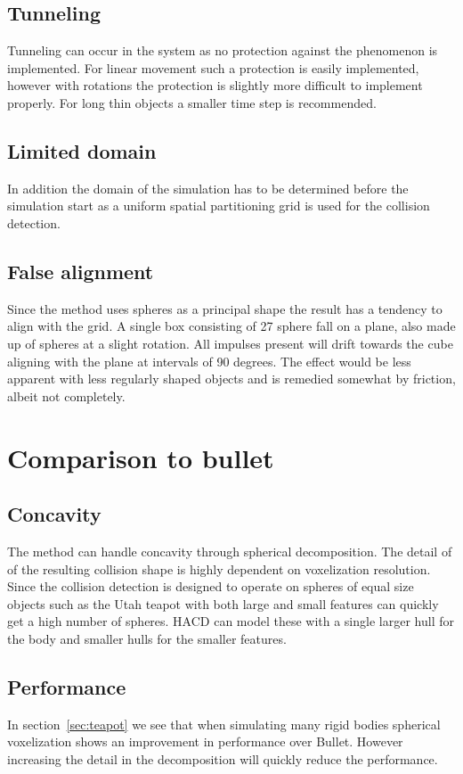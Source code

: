 \subsection{Tunneling}
Tunneling can occur in the system as no protection against the phenomenon is implemented.
For linear movement such a protection is easily implemented, however with rotations
the protection is slightly more difficult to implement properly. For long thin
objects a smaller time step is recommended.
\subsection{Limited domain}
In addition the domain of the simulation has to be determined before the simulation start
as a uniform spatial partitioning grid is used for the collision detection.

\subsection{False alignment}
Since the method uses spheres as a principal shape the result has a tendency to align
with the grid. A single box consisting of 27 sphere fall on a plane, also made up of spheres
at a slight rotation. All impulses present will drift towards the cube aligning with the
plane at intervals of 90 degrees. The effect would be less apparent with less regularly shaped objects and
is remedied somewhat by friction, albeit not completely.

\section{Comparison to bullet}
\subsection{Concavity}
The method can handle concavity through spherical decomposition. The detail of of
the resulting collision shape is highly dependent on voxelization resolution.
Since the collision detection is designed to operate on spheres of equal size
objects such as the Utah teapot with both large and small features can quickly get
a high number of spheres. HACD can model these with a single larger hull for the body
and smaller hulls for the smaller features.

\subsection{Performance}
In section~\ref{sec:teapot} we see that when simulating many rigid bodies spherical
voxelization shows an improvement in performance over Bullet. However increasing
the detail in the decomposition will quickly reduce the performance.

